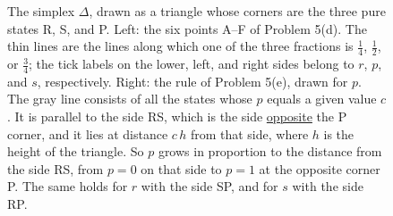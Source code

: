 \documentclass[a4paper,12pt]{article}
\begin{document}
\begin{figure}[htbp]
\begin{center}
\caption{The simplex $\Delta$, drawn as a triangle whose corners are the three pure states R, S, and P.
Left: the six points A--F of Problem 5(d). The thin lines are the lines along which one of the three fractions is $\frac{1}{4}$, $\frac{1}{2}$, or $\frac{3}{4}$; the tick labels on the lower, left, and right sides belong to $r$, $p$, and $s$, respectively.
Right: the rule of Problem 5(e), drawn for $p$. The gray line consists of all the states whose $p$ equals a given value $c$. It is parallel to the side RS, which is the side \underline{opposite} the P corner, and it lies at distance $c\,h$ from that side, where $h$ is the height of the triangle. So $p$ grows in proportion to the distance from the side RS, from $p=0$ on that side to $p=1$ at the opposite corner P. The same holds for $r$ with the side SP, and for $s$ with the side RP.}
\label{fig:simplex}
\end{center}
\end{figure}
\end{document}
